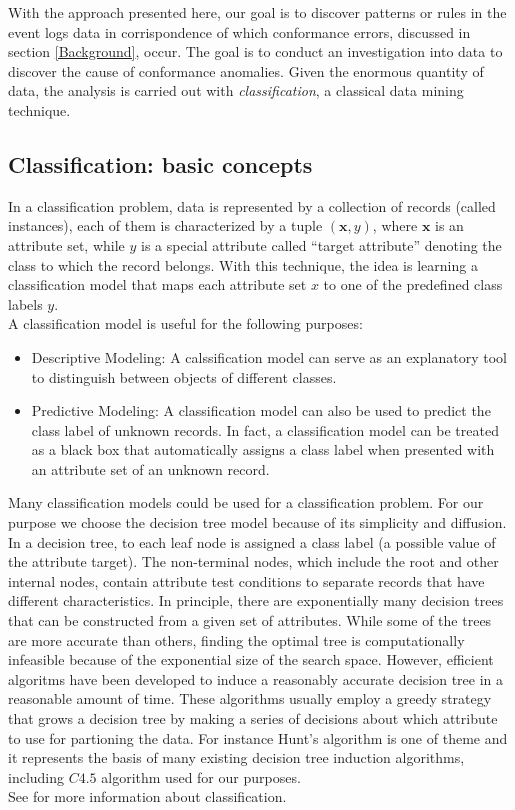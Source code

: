 \documentclass{llncs}
\begin{document}
With the approach presented here, our goal is to discover patterns or rules in the event logs data in corrispondence of which conformance errors, discussed in section \ref{Background}, occur. The goal is to conduct an investigation into data to discover the cause of conformance anomalies. Given the enormous quantity of data, the analysis is carried out with \emph{classification}, a classical data mining technique.


\subsection{Classification: basic concepts}

In a classification problem, data is represented by a collection of records (called instances), each of them is characterized by a tuple $(\mathbf{x},y)$, where $\mathbf{x}$ is an attribute set, while $y$ is a special attribute called ``target attribute'' denoting the class to which the record belongs. With this technique, the idea is learning a classification model that maps each attribute set $x$ to one of the predefined class labels $y$.\\

A classification model is useful for the following purposes:
\begin{itemize}
\item Descriptive Modeling: A calssification model can serve as an explanatory tool to distinguish between objects of different classes.
\item Predictive Modeling:  A classification model can also be used to predict the class label of unknown records. In fact, a classification model can be treated as a black box that automatically assigns a class label when presented with an attribute set of an unknown record.
\end{itemize}

Many classification models could be used for a classification problem. For our purpose we choose the decision tree model because of its simplicity and diffusion. In a decision tree, to each leaf node is assigned a class label (a possible value of the attribute target). The non-terminal nodes, which include the root and other internal nodes, contain attribute test conditions to separate records that have different characteristics. In principle, there are exponentially many decision trees that can be constructed from a given set of attributes. While some of the trees are more accurate than others, finding the optimal tree is computationally infeasible because of the exponential size of the search space. However, efficient algoritms have been developed to induce a reasonably accurate decision tree in a reasonable amount of time. These algorithms usually employ a greedy strategy that grows a decision tree by making a series of decisions about which attribute to use for partioning the data. For instance Hunt's algorithm is one of theme and it represents the basis of many existing decision tree induction algorithms, including $C4.5$ algorithm used for our purposes.\\
See \cite{} for more information about classification.\\
\end{document}
